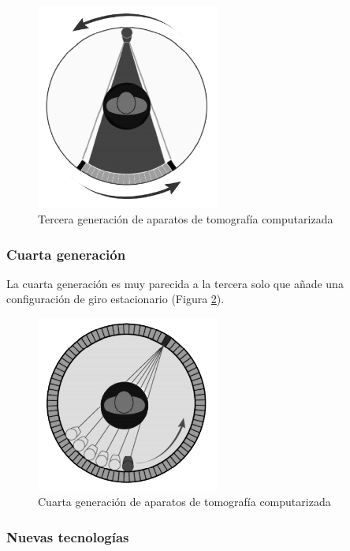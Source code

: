 \begin{figure}[H]
	\centering
	\includegraphics[width=6cm]{imagenes/introduccion/tercera-generacion}
	\caption{Tercera generación de aparatos de tomografía computarizada \cite{garcia14}}
	\label{fig:introduccion/tercera-generacion}
\end{figure}

\subsubsection{Cuarta generación}

La cuarta generación es muy parecida a la tercera solo que añade una configuración de giro estacionario (Figura \ref{fig:introduccion/cuarta-generacion}).

\begin{figure}[H]
	\centering
	\includegraphics[width=6cm]{imagenes/introduccion/cuarta-generacion}
	\caption{Cuarta generación de aparatos de tomografía computarizada \cite{garcia14}}
	\label{fig:introduccion/cuarta-generacion}
\end{figure}

\subsubsection{Nuevas tecnologías}

